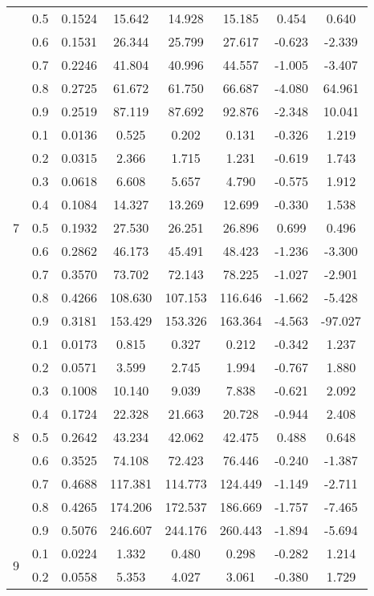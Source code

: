 \documentclass[11pt,a4paper]{report}
\begin{document}
\begin{longtable}{ | c | c || c | c | c | c | c | c | }
 & 0.5 & 0.1524 & 15.642 & 14.928 & 15.185 & 0.454 & 0.640 \\
 & 0.6 & 0.1531 & 26.344 & 25.799 & 27.617 & -0.623 & -2.339 \\
 & 0.7 & 0.2246 & 41.804 & 40.996 & 44.557 & -1.005 & -3.407 \\
 & 0.8 & 0.2725 & 61.672 & 61.750 & 66.687 & -4.080 & 64.961 \\
 & 0.9 & 0.2519 & 87.119 & 87.692 & 92.876 & -2.348 & 10.041 \\
 \hline
\multirow{9}{*}{7} & 0.1 & 0.0136 & 0.525 & 0.202 & 0.131 & -0.326 & 1.219 \\
 & 0.2 & 0.0315 & 2.366 & 1.715 & 1.231 & -0.619 & 1.743 \\
 & 0.3 & 0.0618 & 6.608 & 5.657 & 4.790 & -0.575 & 1.912 \\
 & 0.4 & 0.1084 & 14.327 & 13.269 & 12.699 & -0.330 & 1.538 \\
 & 0.5 & 0.1932 & 27.530 & 26.251 & 26.896 & 0.699 & 0.496 \\
 & 0.6 & 0.2862 & 46.173 & 45.491 & 48.423 & -1.236 & -3.300 \\
 & 0.7 & 0.3570 & 73.702 & 72.143 & 78.225 & -1.027 & -2.901 \\
 & 0.8 & 0.4266 & 108.630 & 107.153 & 116.646 & -1.662 & -5.428 \\
 & 0.9 & 0.3181 & 153.429 & 153.326 & 163.364 & -4.563 & -97.027 \\
 \hline
\multirow{9}{*}{8} & 0.1 & 0.0173 & 0.815 & 0.327 & 0.212 & -0.342 & 1.237 \\
 & 0.2 & 0.0571 & 3.599 & 2.745 & 1.994 & -0.767 & 1.880 \\
 & 0.3 & 0.1008 & 10.140 & 9.039 & 7.838 & -0.621 & 2.092 \\
 & 0.4 & 0.1724 & 22.328 & 21.663 & 20.728 & -0.944 & 2.408 \\
 & 0.5 & 0.2642 & 43.234 & 42.062 & 42.475 & 0.488 & 0.648 \\
 & 0.6 & 0.3525 & 74.108 & 72.423 & 76.446 & -0.240 & -1.387 \\
 & 0.7 & 0.4688 & 117.381 & 114.773 & 124.449 & -1.149 & -2.711 \\
 & 0.8 & 0.4265 & 174.206 & 172.537 & 186.669 & -1.757 & -7.465 \\
 & 0.9 & 0.5076 & 246.607 & 244.176 & 260.443 & -1.894 & -5.694 \\
 \hline
\multirow{9}{*}{9} & 0.1 & 0.0224 & 1.332 & 0.480 & 0.298 & -0.282 & 1.214 \\
 & 0.2 & 0.0558 & 5.353 & 4.027 & 3.061 & -0.380 & 1.729 \\

\end{longtable}
\end{document}
